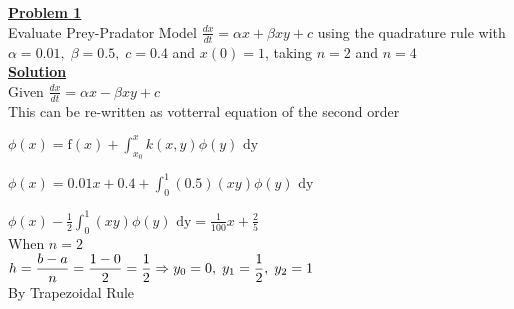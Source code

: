 \documentclass[a4paper,12pt]{report}
\newcommand{\bt}[1]{\textbf{#1}}
\newcommand{\ubt}[1]{\textbf{\underline{#1}}}
\newcommand{\sps}{\\[0.2cm]}
\newcommand{\spn}[1]{\\[#1cm]}
\newcommand{\NI}{\noindent}
\newcommand{\beq}{\NI$\displaystyle}
\newcommand{\eeq}{$}
\newcommand{\eeqn}{$\\[0.3cm]}
\begin{document}
	\chapter{}
	\bt{\underline{Problem 1}}\\
	Evaluate Prey-Pradator Model $\frac{dx}{dt} = \alpha x + \beta xy + c$ using the quadrature rule with $\alpha = 0.01, \; \beta = 0.5, \; c = 0.4$ and $x(0) = 1$, taking $n = 2$ and $n = 4$\sps
	\ubt{Solution}\sps
	Given $\frac{dx}{dt} = \alpha x - \beta xy + c$\\
	This can be re-written as votterral equation of the second order

	\beq \phi(x) = \text{f}(x) + \int_{x_0}^{x} k(x,y) \phi (y) \text{ dy}\eeq
	
	\beq\phi(x) = 0.01x + 0.4 + \int_{0}^{1}(0.5)(xy)\phi(y) \text{ dy}\eeq
	
	\beq\phi(x) - \frac{1}{2} \int_{0}^{1} (xy) \phi(y)\text{ dy} = \frac{1}{100}x + \frac{2}{5} \eeq \\

	\NI When $n=2$\sps
	\beq h = \frac{b-a}{n} = \frac{1-0}{2} = \frac{1}{2} \\[0.2cm]
	\Rightarrow y_0 = 0, \; y_1 = \frac{1}{2}, \; y_2 = 1
	\eeqn
	By Trapezoidal Rule\spn{0.3}
\end{document}
